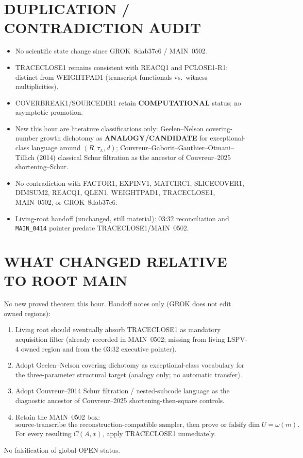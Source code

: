 \documentclass[11pt]{article}
\begin{document}
\section*{DUPLICATION / CONTRADICTION AUDIT}
\begin{itemize}
\item No scientific state change since GROK~8dab37c6 / MAIN~0502.
\item TRACECLOSE1 remains consistent with REACQ1 and PCLOSE1-R1; distinct from
WEIGHTPAD1 (transcript functionals vs.\ witness multiplicities).
\item COVERBREAK1/SOURCEDIR1 retain \textbf{COMPUTATIONAL} status; no asymptotic promotion.
\item New this hour are literature classifications only: Geelen--Nelson covering-number
growth dichotomy as \textbf{ANALOGY/CANDIDATE} for exceptional-class language around
$(R,\tau_L,d)$; Couvreur--Gaborit--Gauthier--Otmani--Tillich (2014) classical Schur
filtration as the ancestor of Couvreur--2025 shortening--Schur.
\item No contradiction with FACTOR1, EXPINV1, MATCIRC1, SLICECOVER1, DIMSUM2, REACQ1,
QLEN1, WEIGHTPAD1, TRACECLOSE1, MAIN~0502, or GROK~8dab37c6.
\item Living-root handoff (unchanged, still material): 03:32 reconciliation and
\texttt{MAIN\_0414} pointer predate TRACECLOSE1/MAIN~0502.
\end{itemize}

\section*{WHAT CHANGED RELATIVE TO ROOT MAIN}
No new proved theorem this hour. Handoff notes only (GROK does not edit owned regions):
\begin{enumerate}
\item Living root should eventually absorb TRACECLOSE1 as mandatory acquisition filter
(already recorded in MAIN~0502; missing from living LSPV-4 owned region and from the
03:32 executive pointer).
\item Adopt Geelen--Nelson covering dichotomy as exceptional-class vocabulary for the
three-parameter structural target (analogy only; no automatic transfer).
\item Adopt Couvreur--2014 Schur filtration / nested-subcode language as the diagnostic
ancestor of Couvreur--2025 shortening-then-square controls.
\item Retain the MAIN~0502 box:
\[
\boxed{\text{source-transcribe the reconstruction-compatible sampler, then prove or falsify
}\dim U=\omega(m).}
\]
For every resulting $C(A,x)$, apply TRACECLOSE1 immediately.
\end{enumerate}
No falsification of global OPEN status.
\end{document}
